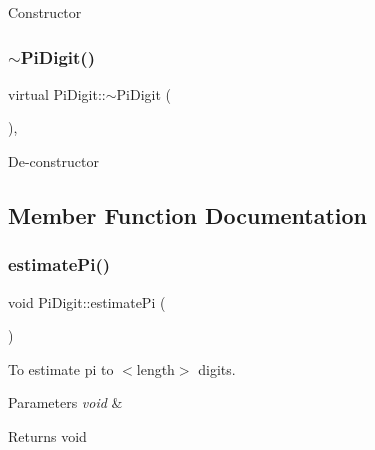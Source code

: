 Constructor \mbox{\label{classPiDigit_aa0f42ed34e114727252adf725dcb6423}} 
\subsubsection{\texorpdfstring{$\sim$\+Pi\+Digit()}{~PiDigit()}}
{\footnotesize\ttfamily virtual Pi\+Digit\+::$\sim$\+Pi\+Digit (\begin{DoxyParamCaption}\item[{void}]{ }\end{DoxyParamCaption})\hspace{0.3cm}{\ttfamily [inline]}, {\ttfamily [virtual]}}

De-\/constructor 

\subsection{Member Function Documentation}
\mbox{\label{classPiDigit_a22de7b729cf3eb47aa7cb18ba3e25a2e}} 
\subsubsection{\texorpdfstring{estimate\+Pi()}{estimatePi()}}
{\footnotesize\ttfamily void Pi\+Digit\+::estimate\+Pi (\begin{DoxyParamCaption}\item[{void}]{ }\end{DoxyParamCaption})\hspace{0.3cm}{\ttfamily [virtual]}}



To estimate pi to $<$length$>$ digits. 


\begin{DoxyParams}{Parameters}
{\em void} & \\
\hline
\end{DoxyParams}
\begin{DoxyReturn}{Returns}
void 
\end{DoxyReturn}
\mbox{\label{classPiDigit_aa14bbb69f9e54b0c750596ee1b2b6f6a}} 
